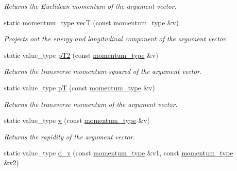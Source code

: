 \begin{DoxyCompactItemize}
\begin{DoxyCompactList}\small\item\em Returns the Euclidean momentum of the argument vector. \end{DoxyCompactList}\item 
\hypertarget{a00451_ab915e1ecc228419ee781937b8219c5a6}{}static \hyperlink{a00579}{momentum\+\_\+type} \hyperlink{a00451_ab915e1ecc228419ee781937b8219c5a6}{vec\+T} (const \hyperlink{a00579}{momentum\+\_\+type} \&v)\label{a00451_ab915e1ecc228419ee781937b8219c5a6}

\begin{DoxyCompactList}\small\item\em Projects out the energy and longitudinal component of the argument vector. \end{DoxyCompactList}\item 
\hypertarget{a00451_af03a3095af264195440bfd38e5fa306e}{}static value\+\_\+type \hyperlink{a00451_af03a3095af264195440bfd38e5fa306e}{p\+T2} (const \hyperlink{a00579}{momentum\+\_\+type} \&v)\label{a00451_af03a3095af264195440bfd38e5fa306e}

\begin{DoxyCompactList}\small\item\em Returns the transverse momentum-\/squared of the argument vector. \end{DoxyCompactList}\item 
\hypertarget{a00451_ad046f21ce16e6b3cb5c2547b2523639a}{}static value\+\_\+type \hyperlink{a00451_ad046f21ce16e6b3cb5c2547b2523639a}{p\+T} (const \hyperlink{a00579}{momentum\+\_\+type} \&v)\label{a00451_ad046f21ce16e6b3cb5c2547b2523639a}

\begin{DoxyCompactList}\small\item\em Returns the transverse momentum of the argument vector. \end{DoxyCompactList}\item 
\hypertarget{a00451_acb7928c8b021ee97341f8fed63e5ef00}{}static value\+\_\+type \hyperlink{a00451_acb7928c8b021ee97341f8fed63e5ef00}{y} (const \hyperlink{a00579}{momentum\+\_\+type} \&v)\label{a00451_acb7928c8b021ee97341f8fed63e5ef00}

\begin{DoxyCompactList}\small\item\em Returns the rapidity of the argument vector. \end{DoxyCompactList}\item 
\hypertarget{a00451_a9e228e7bb6e859a03ba0d3caf2802f7d}{}static value\+\_\+type \hyperlink{a00451_a9e228e7bb6e859a03ba0d3caf2802f7d}{d\+\_\+y} (const \hyperlink{a00579}{momentum\+\_\+type} \&v1, const \hyperlink{a00579}{momentum\+\_\+type} \&v2)\label{a00451_a9e228e7bb6e859a03ba0d3caf2802f7d}


\end{DoxyCompactItemize}
